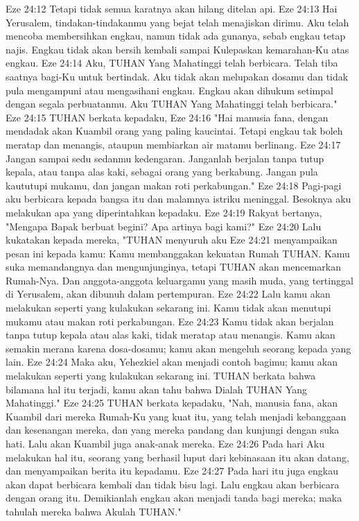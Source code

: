 Eze 24:12  Tetapi tidak semua karatnya akan hilang ditelan api.
Eze 24:13  Hai Yerusalem, tindakan-tindakanmu yang bejat telah menajiskan dirimu. Aku telah mencoba membersihkan engkau, namun tidak ada gunanya, sebab engkau tetap najis. Engkau tidak akan bersih kembali sampai Kulepaskan kemarahan-Ku atas engkau.
Eze 24:14  Aku, TUHAN Yang Mahatinggi telah berbicara. Telah tiba saatnya bagi-Ku untuk bertindak. Aku tidak akan melupakan dosamu dan tidak pula mengampuni atau mengasihani engkau. Engkau akan dihukum setimpal dengan segala perbuatanmu. Aku TUHAN Yang Mahatinggi telah berbicara."
Eze 24:15  TUHAN berkata kepadaku,
Eze 24:16  "Hai manusia fana, dengan mendadak akan Kuambil orang yang paling kaucintai. Tetapi engkau tak boleh meratap dan menangis, ataupun membiarkan air matamu berlinang.
Eze 24:17  Jangan sampai sedu sedanmu kedengaran. Janganlah berjalan tanpa tutup kepala, atau tanpa alas kaki, sebagai orang yang berkabung. Jangan pula kaututupi mukamu, dan jangan makan roti perkabungan."
Eze 24:18  Pagi-pagi aku berbicara kepada bangsa itu dan malamnya istriku meninggal. Besoknya aku melakukan apa yang diperintahkan kepadaku.
Eze 24:19  Rakyat bertanya, "Mengapa Bapak berbuat begini? Apa artinya bagi kami?"
Eze 24:20  Lalu kukatakan kepada mereka, "TUHAN menyuruh aku
Eze 24:21  menyampaikan pesan ini kepada kamu: Kamu membanggakan kekuatan Rumah TUHAN. Kamu suka memandangnya dan mengunjunginya, tetapi TUHAN akan mencemarkan Rumah-Nya. Dan anggota-anggota keluargamu yang masih muda, yang tertinggal di Yerusalem, akan dibunuh dalam pertempuran.
Eze 24:22  Lalu kamu akan melakukan seperti yang kulakukan sekarang ini. Kamu tidak akan menutupi mukamu atau makan roti perkabungan.
Eze 24:23  Kamu tidak akan berjalan tanpa tutup kepala atau alas kaki, tidak meratap atau menangis. Kamu akan semakin merana karena dosa-dosamu; kamu akan mengeluh seorang kepada yang lain.
Eze 24:24  Maka aku, Yehezkiel akan menjadi contoh bagimu; kamu akan melakukan seperti yang kulakukan sekarang ini. TUHAN berkata bahwa bilamana hal itu terjadi, kamu akan tahu bahwa Dialah TUHAN Yang Mahatinggi."
Eze 24:25  TUHAN berkata kepadaku, "Nah, manusia fana, akan Kuambil dari mereka Rumah-Ku yang kuat itu, yang telah menjadi kebanggaan dan kesenangan mereka, dan yang mereka pandang dan kunjungi dengan suka hati. Lalu akan Kuambil juga anak-anak mereka.
Eze 24:26  Pada hari Aku melakukan hal itu, seorang yang berhasil luput dari kebinasaan itu akan datang, dan menyampaikan berita itu kepadamu.
Eze 24:27  Pada hari itu juga engkau akan dapat berbicara kembali dan tidak bisu lagi. Lalu engkau akan berbicara dengan orang itu. Demikianlah engkau akan menjadi tanda bagi mereka; maka tahulah mereka bahwa Akulah TUHAN."
